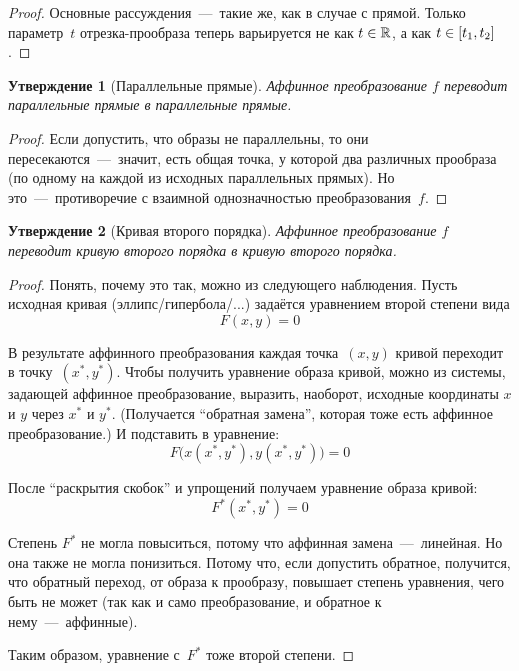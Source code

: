 \documentclass[a4paper,12pt]{article}
\newtheorem{proposition}{Утверждение}[section]
\begin{document}
  \begin{proof}
    Основные рассуждения~---~такие же, как в случае с прямой.
    Только параметр~$t$ отрезка-прообраза теперь варьируется не как $t \hm\in \RR$, а как $t \hm\in [t_1, t_2]$.
  \end{proof}
  
  
  \begin{proposition}[Параллельные прямые]
    Аффинное преобразование $f$ переводит параллельные прямые в параллельные прямые.
  \end{proposition}
  
  \begin{proof}
    Если допустить, что образы не параллельны, то они пересекаются~---~значит, есть общая точка, у которой два различных прообраза (по одному на каждой из исходных параллельных прямых).
    Но это~---~противоречие с взаимной однозначностью преобразования~$f$.
  \end{proof}
  
  
  \begin{proposition}[Кривая второго порядка]
    Аффинное преобразование $f$ переводит кривую второго порядка в кривую второго порядка.
  \end{proposition}
  
  \begin{proof}
    Понять, почему это так, можно из следующего наблюдения.
    Пусть исходная кривая (эллипс/гипербола/...) задаётся уравнением второй степени вида
    \[
      F(x, y) = 0
    \]
    
    В результате аффинного преобразования каждая точка~$(x, y)$ кривой переходит в точку~$(x^*, y^*)$.
    Чтобы получить уравнение образа кривой, можно из системы, задающей аффинное преобразование, выразить, наоборот, исходные координаты $x$ и $y$ через $x^*$ и $y^*$.
    (Получается ``обратная замена'', которая тоже есть аффинное преобразование.)
    И подставить в уравнение:
    \[
      F\bigl(x(x^*, y^*), y(x^*, y^*)\bigr) = 0
    \]
    
    После ``раскрытия скобок'' и упрощений получаем уравнение образа кривой:
    \[
      F^*(x^*, y^*) = 0
    \]
    
    Степень $F^*$ не могла повыситься, потому что аффинная замена~---~линейная.
    Но она также не могла понизиться.
    Потому что, если допустить обратное, получится, что обратный переход, от образа к прообразу, повышает степень уравнения, чего быть не может (так как и само преобразование, и обратное к нему~---~аффинные).
    
    Таким образом, уравнение с~$F^*$ тоже второй степени.
  \end{proof}
  
\end{document}
